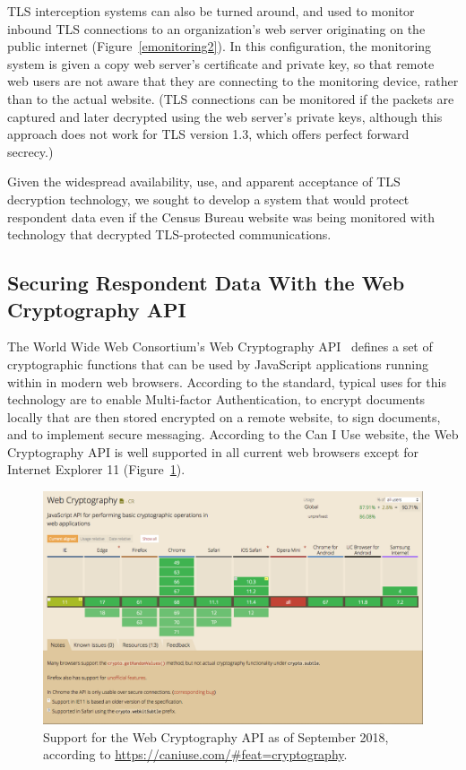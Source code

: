 \documentclass[fleqn,12pt]{wlscirep}
\begin{document}
TLS interception systems can also be turned around, and used to
monitor inbound TLS connections to an organization's web server
originating on the public internet
(Figure~\ref{emonitoring2}). In this configuration, the monitoring
system is given a copy web server's certificate and private key, so
that remote web users are not aware that they are connecting to the
monitoring device, rather than to the actual website. (TLS connections can be
monitored if the packets are captured and later decrypted using
the web server's private keys, although this approach does not work
for TLS version 1.3, which offers perfect forward secrecy.)

Given the widespread availability, use, and apparent acceptance of TLS
decryption technology, we sought to develop a system that would
protect respondent data even if the Census Bureau website was being
monitored with technology that decrypted TLS-protected communications. 
 
\subsection{Securing Respondent Data With the Web Cryptography API}

The World Wide Web Consortium's Web Cryptography API~\cite{wcapi}
defines a set of cryptographic functions that can be used by
JavaScript applications running within in modern web browsers. According to the
standard, typical uses for this technology are to enable Multi-factor
Authentication, to encrypt documents locally that are then stored
encrypted on a remote website, to sign documents, and to implement
secure messaging. According to the Can I Use website, the Web
Cryptography API is well supported in all current web browsers except
for Internet Explorer 11 (Figure~\ref{caniuse}).

\begin{figure}
  \includegraphics[width=\linewidth]{art/caniuse}
  \caption{Support for the Web Cryptography API as of September 2018,
    according to \url{https://caniuse.com/\#feat=cryptography}.\label{caniuse}}
\end{figure}
\end{document}
